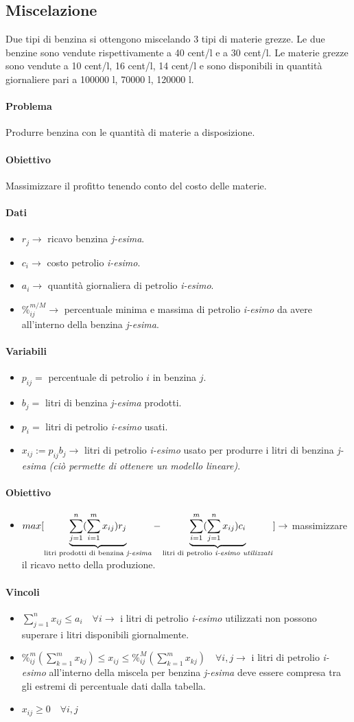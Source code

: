 \documentclass[12pt, twoside, letterpaper]{article}
\newcommand{\problemai}[5]{
	#1
	\begin{dati}
		\paragraph{Dati} 
			\begin{itemize}
				#2
			\end{itemize}
	\end{dati}
	\begin{variabili}
		\paragraph{Variabili} 
			\begin{itemize}
				#3
			\end{itemize}
	\end{variabili}
	\begin{obiettivo}
		\paragraph{Obiettivo} 
			\begin{itemize}
				#4
			\end{itemize}
	\end{obiettivo}
	\begin{vincoli}
		\paragraph{Vincoli}
			\begin{itemize}
				#5
			\end{itemize}
	\end{vincoli}
}
\begin{document}
		\subsection{Miscelazione}			
			\problemai
			{
				Due tipi di benzina si ottengono miscelando 3 tipi di materie grezze. Le due benzine sono vendute rispettivamente a  40 cent/l e a 30 cent/l. Le materie grezze sono vendute a 10 cent/l, 16 cent/l, 14 cent/l e sono disponibili in quantità giornaliere pari a 100000 l, 70000 l, 120000 l.
				\paragraph{Problema} Produrre benzina con le quantità di materie a disposizione.
				\paragraph{Obiettivo} Massimizzare il profitto tenendo conto del costo delle materie.
			}
			{
				\item $r_j \rightarrow$ ricavo benzina \textit{j-esima}.
				\item $c_i \rightarrow$ costo petrolio \textit{i-esimo}.
				\item $a_i \rightarrow$ quantità giornaliera di petrolio \textit{i-esimo}.
				\item $\%_{ij}^{m/M} \rightarrow$ percentuale minima e massima di petrolio \textit{i-esimo} da avere all'interno della benzina \textit{j-esima}.
			}
			{
				\item $p_{ij} = $ percentuale di petrolio $i$ in benzina $j$.
				\item $b_j =$ litri di benzina \textit{j-esima} prodotti.
				\item $p_i = $ litri di petrolio \textit{i-esimo} usati.
				\item $x_{ij} := p_{ij} b_j \rightarrow$ litri di petrolio \textit{i-esimo} usato per produrre i litri di benzina \textit{j-esima} \textit{(ciò permette di ottenere un modello lineare)}.
			}
			{
				\item $max [ \underbrace{\sum_{j=1}^n(\sum_{i=1}^m x_{ij}) r_j}_{\text{litri prodotti di benzina \textit{j-esima}}} - \underbrace{\sum_{i=1}^m(\sum_{j=1}^nx_{ij}) c_i}_{\text{litri di petrolio \textit{i-esimo utilizzati}}}] \rightarrow$ massimizzare il ricavo netto della produzione.
			}
			{
				\item $\sum_{j=1}^n x_{ij} \leq a_i \quad \forall i \rightarrow$ i litri di petrolio \textit{i-esimo} utilizzati non possono superare i litri disponibili giornalmente.
				\item $\%_{ij}^m (\sum_{k=1}^m x_{kj}) \leq x_{ij} \leq \%_{ij}^M (\sum_{k=1}^m x_{kj}) \quad \forall i,j \rightarrow$ i litri di petrolio \textit{i-esimo} all'interno della miscela per benzina \textit{j-esima} deve essere compresa tra gli estremi di percentuale dati dalla tabella.
				\item $x_{ij} \geq 0 \quad \forall i,j$
			}
			
\end{document}
